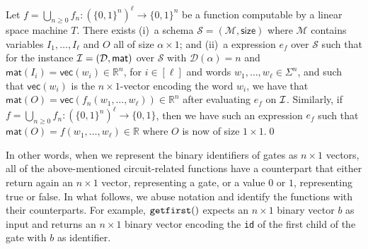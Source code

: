 \begin{proposition} \label{prop:transducer2}
Let $f=\bigcup_{n\geq 0}f_n:(\{0,1\}^n)^\ell\to \{0,1\}^n$ be a function computable by a linear space machine
$T$.
There exists (i)~a \langfor  
schema $\mathcal{S}=(\mathcal{M},\textsf{size})$ where $\mathcal{M}$ contains variables
$I_1,\ldots,I_\ell$ and $O$ all of size $\alpha\times 1$; and (ii)~a \langfor 
expression $e_f$ over $\mathcal{S}$ such that for the instance 
$\mathcal{I}=(\mathcal{D},\textsf{mat})$ over $\mathcal{S}$ with $\mathcal{D}(\alpha)=n$ and 
$\mathsf{mat}(I_i)=\mathsf{vec}(w_i)\in \mathbb{R}^n$,  for $i\in[\ell]$ and words $w_1,\ldots,w_\ell\in\Sigma^n$, and such that $\mathsf{vec}(w_i)$ is the $n\times 1$-vector 
encoding the word $w_i$, we have that  $\mathsf{mat}(O)=\mathsf{vec}(f_n(w_1,\ldots,w_\ell))\in\mathbb{R}^n$ 
after evaluating $e_f$ on $\mathcal{I}$. Similarly, if $f=\bigcup_{n\geq 0}f_n:(\{0,1\}^n)^\ell\to \{0,1\}$, then we have
such an expression $e_f$ such that $\mathsf{mat}(O)=f(w_1,\ldots,w_\ell)\in \mathbb{R}$ where $O$ is now of size $1\times 1$.\qed
\end{proposition}

In other words, when we represent the binary identifiers of gates as $n\times 1$ vectors, all of the above-mentioned circuit-related functions have a \langfor counterpart that either return again an $n\times 1$ vector, representing a gate, or a value $0$ or $1$, representing true or false. In what follows, we  abuse notation and identify the functions with their \langfor counterparts. For example, $\texttt{getfirst}()$ expects an $n\times 1$ binary vector $b$ as input and returns an $n\times 1$ binary vector encoding the \texttt{id} of the first child of the gate with $b$ as identifier.

%
%
%

